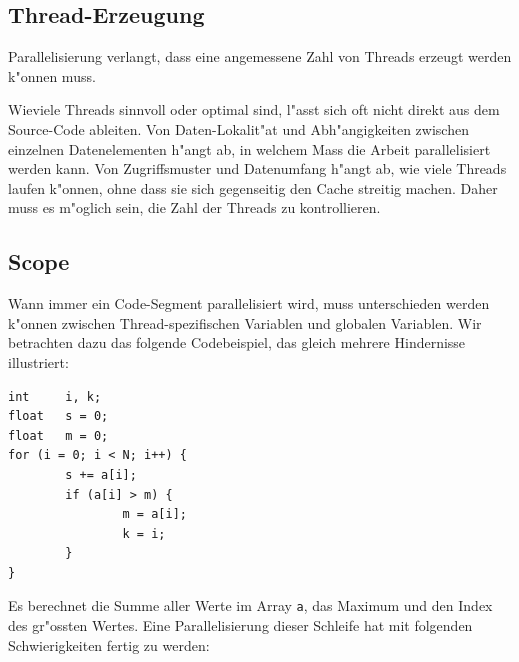 \subsection{Thread-Erzeugung}
Parallelisierung verlangt, dass eine angemessene Zahl von Threads erzeugt
werden k"onnen muss.

Wieviele Threads sinnvoll oder optimal sind, l"asst sich oft nicht
direkt aus dem Source-Code ableiten.
Von
Daten-Lokalit"at und Abh"angigkeiten zwischen einzelnen Datenelementen
h"angt ab, in welchem Mass die Arbeit parallelisiert werden kann.
Von Zugriffsmuster und Datenumfang h"angt ab, wie viele Threads
laufen k"onnen, ohne dass sie sich gegenseitig den Cache streitig machen.
Daher muss es m"oglich sein, die Zahl der Threads zu kontrollieren.

\subsection{Scope}
Wann immer ein Code-Segment parallelisiert wird, muss unterschieden
werden k"onnen zwischen Thread-spezifischen Variablen und globalen
Variablen.
Wir betrachten dazu das folgende Codebeispiel, das gleich mehrere Hindernisse
illustriert: 
\begin{verbatim}
int     i, k;
float   s = 0;
float   m = 0;
for (i = 0; i < N; i++) {
        s += a[i];
        if (a[i] > m) {
                m = a[i];
                k = i;
        }
}
\end{verbatim}
Es berechnet die Summe aller Werte im Array {\tt a}, das Maximum und den
Index des gr"ossten Wertes.
Eine Parallelisierung dieser Schleife hat mit folgenden Schwierigkeiten
fertig zu werden:
